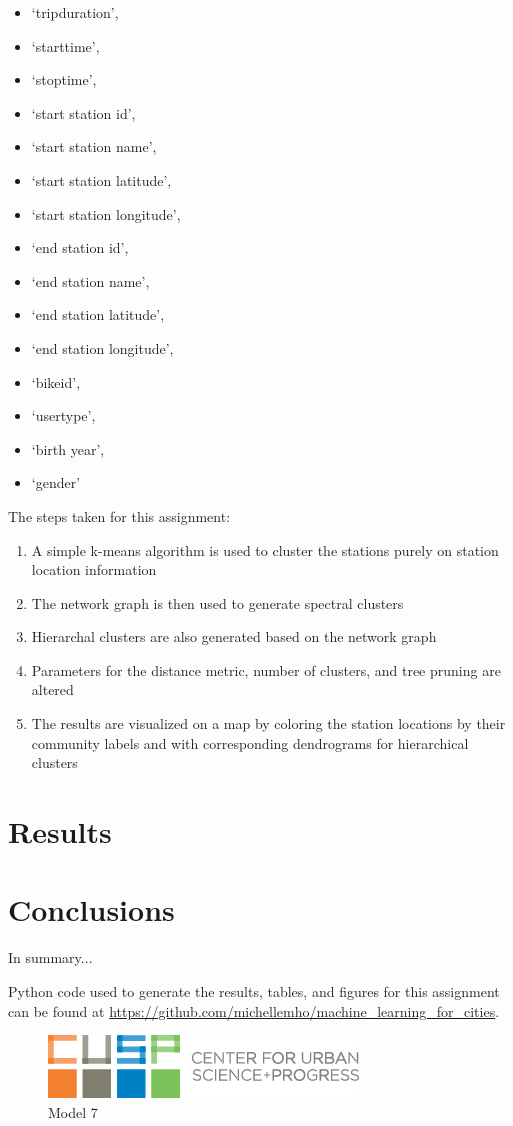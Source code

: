 \documentclass[10pt,twocolumn]{article}
\begin{document}
\begin{itemize}
\item `tripduration',
\item `starttime',
\item `stoptime',
\item `start station id',
\item `start station name',
\item `start station latitude',
\item `start station longitude',
\item `end station id',
\item `end station name',
\item `end station latitude',
\item `end station longitude',
\item `bikeid',
\item `usertype',
\item `birth year',
\item `gender'
\end{itemize}

The steps taken for this assignment:

\begin{enumerate}
\item A simple k-means algorithm is used to cluster the stations purely on station
location information
\item The network graph is then used to generate spectral clusters
\item Hierarchal clusters are also generated based on the network graph
\item Parameters for the distance metric, number of clusters, and tree pruning are altered
\item The results are visualized on a map by coloring the station locations by their
community labels and with corresponding dendrograms for hierarchical clusters
\end{enumerate}

\section{Results}


\section{Conclusions}

In summary...

Python code used to generate the results, tables, and figures for this assignment can be
found at \url{https://github.com/michellemho/machine_learning_for_cities}.


\begin{figure}[!t]
  \begin{center}
    \includegraphics[width=\textwidth,height=\textheight,keepaspectratio]{cusp-index.png}
  \end{center}

  \caption{\small Model 7}
  \label{fig-1}
\end{figure}
\end{document}
